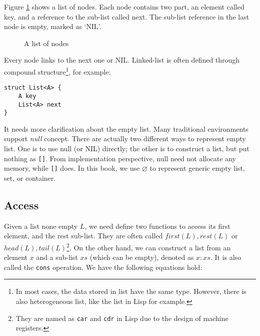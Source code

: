\documentclass[b5paper]{article}
\begin{document}
Figure \ref{fig:list-example} shows a list of nodes. Each node contains two part, an element called key, and a reference to the sub-list called next. The sub-list reference in the last node is empty, marked as `NIL'.

\begin{figure}[htbp]
  \centering
  \caption{A list of nodes}
  \label{fig:list-example}
\end{figure}

Every node links to the next one or NIL. Linked-list is often defined through compound structure\footnote{In most cases, the data stored in list have the same type. However, there is also heterogeneous list, like the list in Lisp for example.}, for example:

\lstset{frame=single}
\begin{lstlisting}[language=Bourbaki]
struct List<A> {
    A key
    List<A> next
}
\end{lstlisting}

 
It needs more clarification about the empty list. Many traditional environments support {\em null} concept. There are actually two different ways to represent empty list. One is to use null (or NIL) directly; the other is to construct a list, but put nothing as \texttt{[]}. From implementation perspective, null need not allocate any memory, while \texttt{[]} does. In this book, we use $\varnothing$ to represent generic empty list, set, or container.

\subsection{Access}
 
 
Given a list none empty $L$, we need define two functions to access its first element, and the rest sub-list. They are often called $first(L), rest(L)$ or $head(L), tail(L)$\footnote{They are named as \texttt{car} and \texttt{cdr} in Lisp due to the design of machine registers\cite{SICP}.}. On the other hand, we can construct a list from an element $x$ and a sub-list $xs$ (which can be empty), denoted as $x : xs$. It is also called the \texttt{cons} operation. We have the following equations hold:
\end{document}
